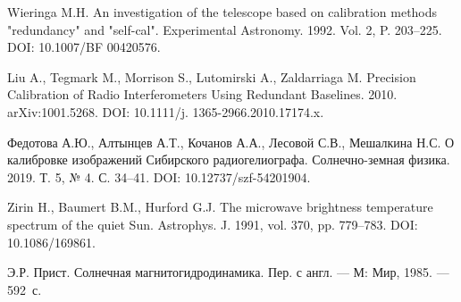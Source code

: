 \documentclass[a4paper,14pt]{extarticle}
\theoremstyle{definition}
\numberwithin{equation}{section}
\begin{document}

\restoregeometry
{}

\setcounter{page}{3}
\tableofcontents
\restoregeometry

\newpage
\sloppy
\pagestyle{fancy}

%

%
{}
\printindex

\newpage
{}
\begin{thebibliography}{99}

 Wieringa M.H. An investigation of the telescope based on calibration methods "redundancy" and "self-cal". Experimental Astronomy. 1992. Vol. 2, P. 203–225. DOI: 10.1007/BF 00420576.

 Liu A., Tegmark M., Morrison S., Lutomirski A., Zaldarriaga M. Precision Calibration of Radio Interferometers Using Redundant Baselines. 2010. arXiv:1001.5268. DOI: 10.1111/j. 1365-2966.2010.17174.x.

 Федотова А.Ю., Алтынцев А.Т., Кочанов А.А., Лесовой С.В., Мешалкина Н.С. О калибровке изображений Сибирского радиогелиографа. Солнечно-земная физика. 2019. Т. 5, № 4. С. 34–41. DOI: 10.12737/szf-54201904.

 Zirin H., Baumert B.M., Hurford G.J. The microwave brightness temperature spectrum of the quiet Sun. Astrophys. J. 1991, vol. 370, pp. 779–783. DOI: 10.1086/169861.



 Э.Р. Прист. Солнечная магнитогидродинамика. Пер. с англ. --- М:  Мир, 1985. --- 592~с.

\end{thebibliography}

\end{document}
